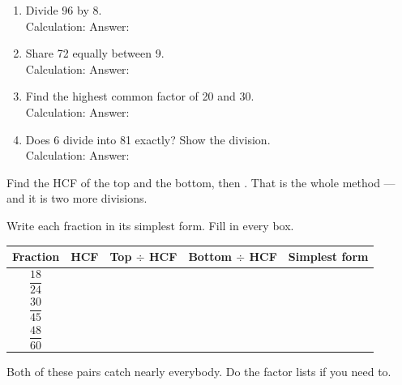 \documentclass[12pt,a4paper]{article}
\begin{document}
\vspace{6pt}
\begin{enumerate}[label=\arabic*., itemsep=8pt]
  \item Divide 96 by 8. \\[4pt]
        Calculation: \blank[6.2cm] \quad Answer: \blank[2.4cm]
  \item Share 72 equally between 9. \\[4pt]
        Calculation: \blank[6.2cm] \quad Answer: \blank[2.4cm]
  \item Find the highest common factor of 20 and 30. \\[4pt]
        Calculation: \blank[6.2cm] \quad Answer: \blank[2.4cm]
  \item Does 6 divide into 81 exactly? Show the division. \\[4pt]
        Calculation: \blank[6.2cm] \quad Answer: \blank[2.4cm]
\end{enumerate}


\begin{remember}
  Find the HCF of the top and the bottom, then .
  That is the whole method --- and it is two more divisions.
\end{remember}

\noindent Write each fraction in its simplest form. Fill in every box.

\vspace{10pt}
\noindent
\begin{tabularx}{\textwidth}{|c|p{2.2cm}|X|X|p{2.4cm}|}
  \hline
  \textbf{Fraction} & \textbf{HCF} & \textbf{Top $\div$ HCF} & \textbf{Bottom $\div$ HCF}
  & \textbf{Simplest form} \\
  \hline
  $\dfrac{18}{24}$ \rule[-1.2em]{0pt}{3.0em} & & & & \\ \hline
  $\dfrac{30}{45}$ \rule[-1.2em]{0pt}{3.0em} & & & & \\ \hline
  $\dfrac{48}{60}$ \rule[-1.2em]{0pt}{3.0em} & & & & \\ \hline
\end{tabularx}


\begin{yourturn}
  Both of these pairs catch nearly everybody. Do the factor lists if you need to.
\end{yourturn}
\end{document}
